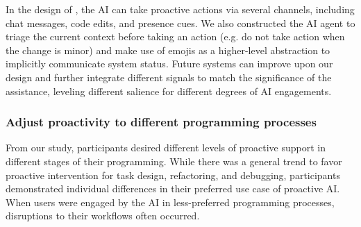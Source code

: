 In the design of \sys{}, the AI can take proactive actions via several channels, including chat messages, code edits, and presence cues.
We also constructed the AI agent to triage the current context before taking an action (e.g. do not take action when the change is minor) and make use of emojis as a higher-level abstraction to implicitly communicate system status.
Future systems can improve upon our design and further integrate different signals to match the significance of the assistance, leveling different salience for different degrees of AI engagements.



\subsubsection{\textbf{Adjust proactivity to different programming processes}}
From our study, participants desired different levels of proactive support in different stages of their programming.
While there was a general trend to favor proactive intervention for task design, refactoring, and debugging, participants demonstrated individual differences in their preferred use case of proactive AI.
When users were engaged by the AI in less-preferred programming processes, disruptions to their workflows often occurred.

